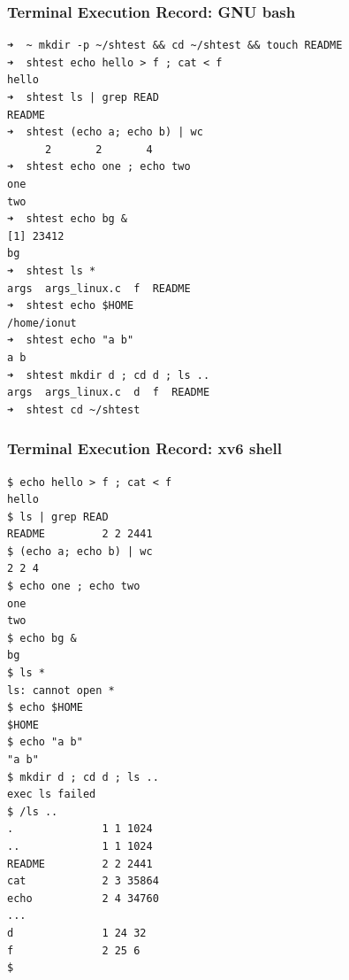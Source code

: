 \documentclass{labreport}
\begin{document}
\subsubsection{Terminal Execution Record: GNU bash}
\begin{lstlisting}[style=bash]
➜  ~ mkdir -p ~/shtest && cd ~/shtest && touch README
➜  shtest echo hello > f ; cat < f
hello
➜  shtest ls | grep READ
README
➜  shtest (echo a; echo b) | wc
      2       2       4
➜  shtest echo one ; echo two
one
two
➜  shtest echo bg &
[1] 23412
bg
➜  shtest ls *
args  args_linux.c  f  README
➜  shtest echo $HOME
/home/ionut
➜  shtest echo "a b"
a b
➜  shtest mkdir d ; cd d ; ls ..
args  args_linux.c  d  f  README
➜  shtest cd ~/shtest
\end{lstlisting}

\subsubsection{Terminal Execution Record: xv6 shell}
\begin{lstlisting}[style=bash]
$ echo hello > f ; cat < f
hello
$ ls | grep READ
README         2 2 2441
$ (echo a; echo b) | wc
2 2 4
$ echo one ; echo two
one
two
$ echo bg &
bg
$ ls *
ls: cannot open *
$ echo $HOME
$HOME
$ echo "a b"
"a b"
$ mkdir d ; cd d ; ls ..
exec ls failed
$ /ls ..
.              1 1 1024
..             1 1 1024
README         2 2 2441
cat            2 3 35864
echo           2 4 34760
...
d              1 24 32
f              2 25 6
$
\end{lstlisting}
\end{document}
